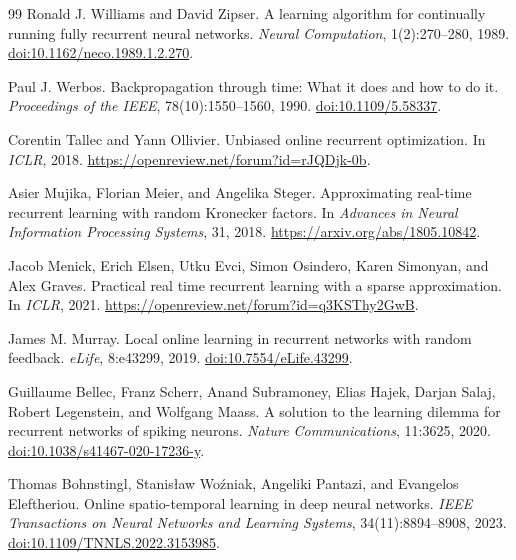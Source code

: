 \documentclass[11pt]{article}
\theoremstyle{definition}
\begin{document}
\begin{thebibliography}{99}
Ronald J. Williams and David Zipser.
A learning algorithm for continually running fully recurrent neural networks.
\emph{Neural Computation}, 1(2):270--280, 1989.
\href{https://doi.org/10.1162/neco.1989.1.2.270}{doi:10.1162/neco.1989.1.2.270}.

Paul J. Werbos. Backpropagation through time: What it does and how to do it.
\emph{Proceedings of the IEEE}, 78(10):1550--1560, 1990.
\href{https://doi.org/10.1109/5.58337}{doi:10.1109/5.58337}.

Corentin Tallec and Yann Ollivier. Unbiased online recurrent optimization.
In \emph{ICLR}, 2018. \url{https://openreview.net/forum?id=rJQDjk-0b}.

Asier Mujika, Florian Meier, and Angelika Steger.
Approximating real-time recurrent learning with random Kronecker factors.
In \emph{Advances in Neural Information Processing Systems}, 31, 2018.
\url{https://arxiv.org/abs/1805.10842}.

Jacob Menick, Erich Elsen, Utku Evci, Simon Osindero, Karen Simonyan, and Alex Graves.
Practical real time recurrent learning with a sparse approximation.
In \emph{ICLR}, 2021. \url{https://openreview.net/forum?id=q3KSThy2GwB}.

James M. Murray. Local online learning in recurrent networks with random feedback.
\emph{eLife}, 8:e43299, 2019. \href{https://doi.org/10.7554/eLife.43299}{doi:10.7554/eLife.43299}.

Guillaume Bellec, Franz Scherr, Anand Subramoney, Elias Hajek, Darjan Salaj,
Robert Legenstein, and Wolfgang Maass.
A solution to the learning dilemma for recurrent networks of spiking neurons.
\emph{Nature Communications}, 11:3625, 2020.
\href{https://doi.org/10.1038/s41467-020-17236-y}{doi:10.1038/s41467-020-17236-y}.

Thomas Bohnstingl, Stanis{\l}aw Wo{\'z}niak, Angeliki Pantazi, and Evangelos Eleftheriou.
Online spatio-temporal learning in deep neural networks.
\emph{IEEE Transactions on Neural Networks and Learning Systems}, 34(11):8894--8908, 2023.
\href{https://doi.org/10.1109/TNNLS.2022.3153985}{doi:10.1109/TNNLS.2022.3153985}.


\end{thebibliography}
\end{document}
